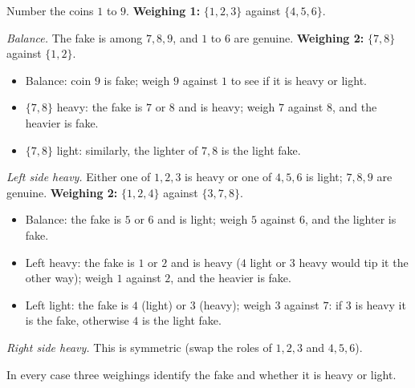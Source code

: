 Number the coins $1$ to $9$. \textbf{Weighing 1:} $\{1,2,3\}$ against $\{4,5,6\}$.

\emph{Balance.} The fake is among $7,8,9$, and $1$ to $6$ are genuine. \textbf{Weighing 2:} $\{7,8\}$ against $\{1,2\}$.
\begin{itemize}
\item Balance: coin $9$ is fake; weigh $9$ against $1$ to see if it is heavy or light.
\item $\{7,8\}$ heavy: the fake is $7$ or $8$ and is heavy; weigh $7$ against $8$, and the heavier is fake.
\item $\{7,8\}$ light: similarly, the lighter of $7,8$ is the light fake.
\end{itemize}

\emph{Left side heavy.} Either one of $1,2,3$ is heavy or one of $4,5,6$ is light; $7,8,9$ are genuine. \textbf{Weighing 2:} $\{1,2,4\}$ against $\{3,7,8\}$.
\begin{itemize}
\item Balance: the fake is $5$ or $6$ and is light; weigh $5$ against $6$, and the lighter is fake.
\item Left heavy: the fake is $1$ or $2$ and is heavy ($4$ light or $3$ heavy would tip it the other way); weigh $1$ against $2$, and the heavier is fake.
\item Left light: the fake is $4$ (light) or $3$ (heavy); weigh $3$ against $7$: if $3$ is heavy it is the fake, otherwise $4$ is the light fake.
\end{itemize}

\emph{Right side heavy.} This is symmetric (swap the roles of $1,2,3$ and $4,5,6$).

In every case three weighings identify the fake and whether it is heavy or light.
